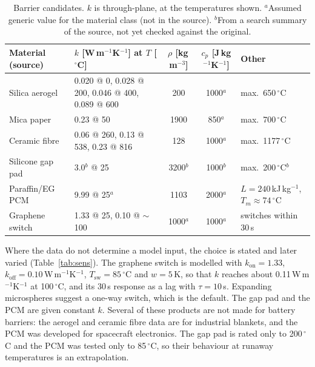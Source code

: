 \documentclass[11pt]{article}
\newcommand{\kon}{k_\mathrm{on}}
\newcommand{\koff}{k_\mathrm{off}}
\newcommand{\Tsw}{T_\mathrm{sw}}
\begin{document}
\begin{table}[!htbp]
  \centering\small
  \caption{Barrier candidates. $k$ is through-plane, at the temperatures shown.
  $^a$Assumed generic value for the material class (not in the source).
  $^b$From a search summary of the source, not yet checked against the original.}
  \label{tab:materials}
  \begin{tabularx}{\linewidth}{@{}lXccl@{}}
    \toprule
    Material (source) & $k$ [W\,m$^{-1}$K$^{-1}$] at $T$ [$^\circ$C] & $\rho$ [kg\,m$^{-3}$]
      & $c_p$ [J\,kg$^{-1}$K$^{-1}$] & Other \\
    \midrule
    Silica aerogel~\cite{aspen2022pyrogel} & 0.020 @ 0, 0.028 @ 200, 0.046 @ 400,
      0.089 @ 600 & 200 & 1000$^a$ & max.\ 650\,$^\circ$C \\
    Mica paper~\cite{gund2026mica} & 0.23 @ 50 & 1900 & 850$^a$ & max.\ 700\,$^\circ$C \\
    Ceramic fibre~\cite{morgan2016rcf} & 0.06 @ 260, 0.13 @ 538, 0.23 @ 816 & 128 & 1000$^a$
      & max.\ 1177\,$^\circ$C \\
    Silicone gap pad~\cite{henkel2026tgp3000} & 3.0$^b$ @ 25 & 3200$^b$ & 1000$^b$
      & max.\ 200\,$^\circ$C$^b$ \\
    Paraffin/EG PCM~\cite{zhao2025pweg} & 9.99 @ 25$^a$ & 1103 & 2000$^a$
      & $L = 240$\,kJ\,kg$^{-1}$, $T_m \approx 74\,^\circ$C \\
    Graphene switch~\cite{wang2024regulator} & 1.33 @ 25, 0.10 @ $\sim$100 & 1000$^a$
      & 1000$^a$ & switches within 30\,s \\
    \bottomrule
  \end{tabularx}
\end{table}

Where the data do not determine a model input, the choice is stated and later varied
(Table~\ref{tab:sens}). The graphene switch is modelled with $\kon = 1.33$,
$\koff = 0.10$\,W\,m$^{-1}$K$^{-1}$, $\Tsw = 85\,^\circ$C and $w = 5$\,K, so that $k$
reaches about 0.11\,W\,m$^{-1}$K$^{-1}$ at 100\,$^\circ$C, and its 30\,s response as a lag
with $\tau = 10$\,s. Expanding microspheres suggest a one-way switch, which is the
default. The gap pad and the PCM are given constant $k$. Several of these products are
not made for battery barriers: the aerogel and ceramic fibre data are for industrial
blankets, and the PCM was developed for spacecraft electronics. The gap pad is rated only
to 200\,$^\circ$C and the PCM was tested only to 85\,$^\circ$C, so their behaviour at
runaway temperatures is an extrapolation.
\end{document}
